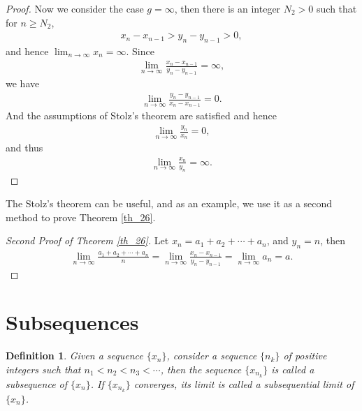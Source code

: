 \documentclass[11pt]{book}
\newtheorem{definition}{Definition}[chapter]
\theoremstyle{definition}
\numberwithin{equation}{chapter}
\begin{document}
\begin{proof}
Now we consider the case $g = \infty$, then there is an integer $N_2 > 0$ such that for $n \geq N_2$,
\begin{align*}
    x_n - x_{n-1} > y_n - y_{n-1} > 0,
\end{align*}
and hence $\lim_{n\to\infty} x_n = \infty$. Since
\begin{align*}
    \lim_{n\to\infty} \frac{x_n - x_{n-1}}{y_n - y_{n-1}} = \infty,
\end{align*}
we have
\begin{align*}
    \lim_{n\to\infty} \frac{y_n - y_{n-1}}{x_n - x_{n-1}} = 0.
\end{align*}
And the assumptions of Stolz's theorem are satisfied and hence
\begin{align*}
    \lim_{n\to\infty} \frac{y_n}{x_n} = 0,
\end{align*}
and thus 
\begin{align*}
    \lim_{n\to\infty} \frac{x_n}{y_n} = \infty.
\end{align*}
\end{proof}

\medskip

The Stolz's theorem can be useful, and as an example, we use it as a second method to prove Theorem \ref{th_26}.

\medskip

\begin{proof}[Second Proof of Theorem \ref{th_26}]
Let $x_n = a_1 + a_2 + \cdots + a_n$, and $y_n = n$, then
\begin{align*}
    \lim_{n\to\infty} \frac{a_1 + a_2 + \cdots + a_n}{n} = \lim_{n\to\infty} \frac{x_n - x_{n-1}}{y_n - y_{n-1}} = \lim_{n\to\infty} a_n = a.
\end{align*}
\end{proof}

\medskip


\section{Subsequences}

\begin{definition}
Given a sequence $\{x_n\}$, consider a sequence $\{n_k\}$ of positive integers such that $n_1 < n_2 < n_3 < \cdots$, then the sequence $\{x_{n_k}\}$ is called a subsequence of $\{x_n\}$. If $\{x_{n_k}\}$ converges, its limit is called a subsequential limit of $\{x_n\}$.
\end{definition}


\medskip
\end{document}
